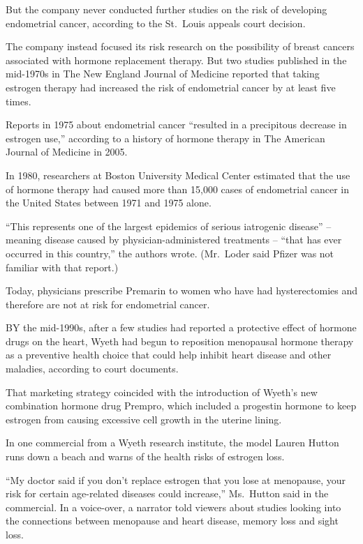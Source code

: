 ﻿\documentclass[12pt]{article}
\begin{document}
But the company never conducted further studies on the risk of developing endometrial cancer,
according to the St.~Louis appeals court decision.

The company instead focused its risk research on the possibility of breast cancers associated with
hormone replacement therapy. But two studies published in the mid-1970s in The New England Journal
of Medicine reported that taking estrogen therapy had increased the risk of endometrial cancer by at
least five times.

Reports in 1975 about endometrial cancer ``resulted in a precipitous decrease in estrogen use,''
according to a history of hormone therapy in The American Journal of Medicine in 2005.

In 1980, researchers at Boston University Medical Center estimated that the use of hormone therapy
had caused more than 15,000 cases of endometrial cancer in the United States between 1971 and 1975
alone.

``This represents one of the largest epidemics of serious iatrogenic disease'' -- meaning disease
caused by physician-administered treatments -- ``that has ever occurred in this country,'' the
authors wrote. (Mr.~Loder said Pfizer was not familiar with that report.)

Today, physicians prescribe Premarin to women who have had hysterectomies and therefore are not at
risk for endometrial cancer.

BY the mid-1990s, after a few studies had reported a protective effect of hormone drugs on the
heart, Wyeth had begun to reposition menopausal hormone therapy as a preventive health choice that
could help inhibit heart disease and other maladies, according to court documents.

That marketing strategy coincided with the introduction of Wyeth's new combination hormone drug
Prempro, which included a progestin hormone to keep estrogen from causing excessive cell growth in
the uterine lining.

In one commercial from a Wyeth research institute, the model Lauren Hutton runs down a beach and
warns of the health risks of estrogen loss.

``My doctor said if you don't replace estrogen that you lose at menopause, your risk for certain
age-related diseases could increase,'' Ms.~Hutton said in the commercial. In a voice-over, a
narrator told viewers about studies looking into the connections between menopause and heart
disease, memory loss and sight loss.
\end{document}
